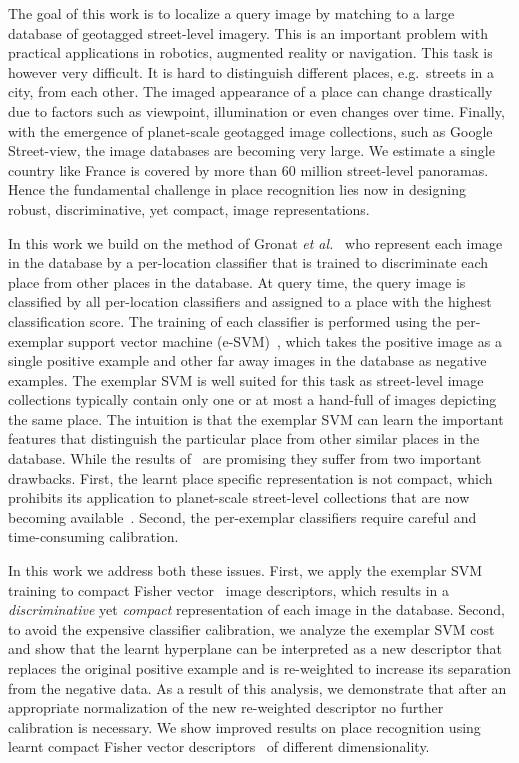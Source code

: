 \documentclass[10pt,twocolumn,letterpaper]{article}
\begin{document}
The goal of this work is to localize a query image by matching to a large database of geotagged street-level imagery.
This is an important problem with practical applications in robotics, augmented reality or navigation. This task is however very difficult. It is hard to distinguish different places, e.g.\ streets in a city, from each other. The imaged appearance of a place can change drastically due to factors such as  viewpoint, illumination or even changes over time.
%
Finally, with the emergence of planet-scale geotagged image collections, such as Google Street-view, the image databases are becoming very large. We estimate a single country like France is covered by more than 60 million street-level panoramas. Hence the fundamental challenge in place recognition lies now in designing robust, discriminative, yet compact, image representations.

In this work we build on the method of Gronat {\it et al.}~\cite{Gronat13} who represent each image in the database by a per-location classifier that is trained to discriminate each place from other places in the database. At query time, the query image is classified by all per-location classifiers and assigned to a place with the highest classification score. The training of each classifier is performed using the per-exemplar support vector machine (e-SVM)~\cite{Malisiewicz11}, which takes the positive image as a single positive example and other far away images in the database as negative examples. 
The exemplar SVM is well suited for this task as street-level image collections typically contain only one or at most a hand-full of images depicting the same place. The intuition is that the exemplar SVM can learn the important features that distinguish the particular place from other similar places  in the database.  While the results of~\cite{Gronat13} are promising they suffer from two important drawbacks. First, the learnt place specific representation is not compact, which prohibits its application to planet-scale street-level collections that are now becoming available~\cite{Klinger13}. Second, the per-exemplar classifiers require careful and time-consuming calibration.


In this work we address both these issues. 
First, we apply the exemplar SVM training to compact Fisher vector~\cite{Jegou2011,Perronnin2010} image descriptors, which results in a {\em discriminative} yet {\em compact} representation of each image in the database. Second, to avoid the expensive classifier calibration, we analyze the exemplar SVM cost and show that the learnt hyperplane can be interpreted as a new descriptor that replaces the original positive example and is re-weighted to increase its separation from the negative data. As a result of this analysis, we demonstrate that after an appropriate normalization of the new re-weighted descriptor no further calibration is necessary. We show improved results on place recognition using learnt compact Fisher vector descriptors~\cite{Jegou2011} of different dimensionality.
\end{document}
